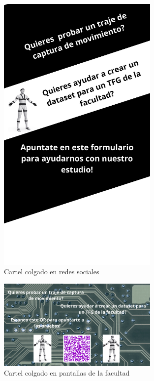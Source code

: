 \begin{figure}[H]
    \centering
    \includegraphics[width=0.7\textwidth]{Imagenes/Bitmap/cartel-instagram.png}
    \caption{Cartel colgado en redes sociales}
    \label{fig:cartel-redes}
\end{figure}

\begin{figure}[H]
    \centering
    \includegraphics[width=0.7\textwidth]{Imagenes/Bitmap/cartel-pantallas.png}
    \caption{Cartel colgado en pantallas de la facultad}
    \label{fig:cartel-pantallas}
\end{figure}